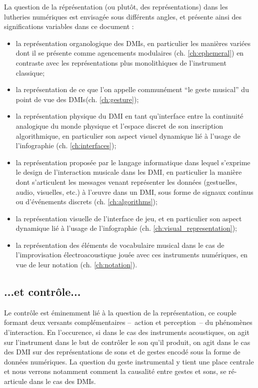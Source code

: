 La question de la réprésentation (ou plutôt, des représentations) dans les lutheries numériques est envisagée sous différents angles, et présente ainsi des significations variables dans ce document : 
\vspace{-1em}
\begin{itemize}[noitemsep]
\item la représentation organologique des \glspl{DMI}, en particulier les manières variées dont il se présente comme agencements modulaires (ch. \ref{ch:ephemeral}) en contraste avec les représentations plus monolithiques de l'instrument classique;
\item la représentation de ce que l'on appelle communément ``le geste musical'' du point de vue des \glspl{DMI}(ch. \ref{ch:gesture});
\item la représentation physique du \gls{DMI} en tant qu'interface entre la continuité analogique du monde physique et l'espace discret de son inscription algorithmique, en particulier son aspect visuel dynamique lié à l'usage de l'infographie (ch. \ref{ch:interfaces});
\item la représentation proposée par le langage informatique dans lequel s'exprime le design de l'interaction musicale dans les \gls{DMI}, en particulier la manière dont s'articulent les messages venant représenter les données (gestuelles, audio, visuelles, etc.) à l'œuvre dans un \gls{DMI}, sous forme de signaux continus ou d'événements discrets (ch. \ref{ch:algorithms});
\item la représentation visuelle de l'interface de jeu, et en particulier son aspect dynamique lié à l'usage de l'infographie (ch. \ref{ch:visual_representation});
\item la représentation des éléments de vocabulaire musical dans le cas de l'improvisation électroacoustique jouée avec ces instruments numériques, en vue de leur notation (ch. \ref{ch:notation}).
\end{itemize}

\subsection*{...et contrôle...}

\noindent Le contrôle est éminemment lié à la question de la représentation, ce couple formant deux versants complémentaires --~action et perception~-- du phénomènes d'interaction. En l'occurence, si dans le cas des instruments acoustiques, on agit sur l'instrument dans le but de contrôler le son qu'il produit, on agit dans le cas des \gls{DMI} sur des représentations de sons et de gestes encodé sous la forme de données numériques. La question du geste instrumental y tient une place centrale et nous verrons notamment comment la causalité entre gestes et sons, se ré-articule dans le cas des \glspl{DMI}.

